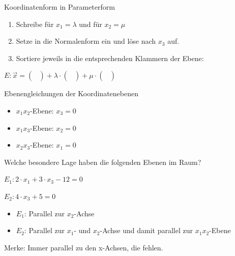 \documentclass[paper=a6,landscape,ngerman,twoside=true,fontsize=12pt]{scrartcl}
\begin{document}
\begin{frage}
	\LARGE
	Koordinatenform in Parameterform
	
\end{frage}
\begin{antwort}
	\normalsize
	\begin{enumerate} 
		\item Schreibe für $x_1 = \lambda$ und für $x_2=\mu$	
		\item Setze in die Normalenform ein und löse nach $x_3$ auf.
		\item Sortiere jeweils in die entsprechenden Klammern der Ebene:			
	\end{enumerate} 
	$E:\vec{x}=\left(\begin{array}{c}  \\  \\ \end{array} \right)+\lambda \cdot \left(\begin{array}{c}  \\  \\ \end{array} \right)+\mu \cdot \left(\begin{array}{c}  \\ \\ \end{array} \right)$
	
\end{antwort}
\begin{frage}
	Ebenengleichungen der Koordinatenebenen
\end{frage}
\begin{antwort}

	\begin{itemize} 
		\item $x_1x_2$-Ebene: $x_3=0$	
		\item $x_1x_3$-Ebene: $x_2=0$
		\item $x_2x_3$-Ebene: $x_1=0$
	\end{itemize} 
	
\end{antwort}
\begin{frage}
	Welche besondere Lage haben die folgenden Ebenen im Raum?
	
	$E_1: 2 \cdot x_1+3  \cdot x_3  -12 = 0$
	
	$E_2: 4 \cdot x_3 +5 = 0$	
	
\end{frage}
\begin{antwort}
	
	\begin{itemize} 
		\item $E_1$: Parallel zur $x_2$-Achse	
		\item $E_2$: Parallel zur $x_1$- und $x_2$-Achse und damit parallel zur $x_1x_2$-Ebene
	\end{itemize} 
	\bigskip
	Merke: Immer parallel zu den x-Achsen, die fehlen.
	
\end{antwort}
\end{document}
